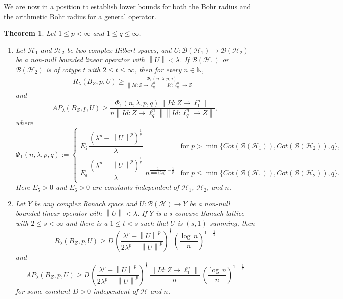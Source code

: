 \documentclass[a4paper,11pt, reqno]{amsart}
\newtheorem{thm}{Theorem}[section]
\theoremstyle{definition}
\newcommand{\norm}[1]{\left\lVert#1\right\rVert}
\begin{document}
We are now in a position to establish lower bounds for both the Bohr radius and the arithmetic Bohr radius for a general operator.
	\begin{thm} \label{thm-1.9}
	Let $1 \leq p < \infty$ and $1\leq q \leq \infty$.
	\begin{enumerate}
		\item Let $\mathcal{H}_1$ and $\mathcal{H}_2$ be two complex Hilbert spaces, and $U: \mathcal{B}(\mathcal{H}_1) \rightarrow \mathcal{B}(\mathcal{H}_2)$ be a non-null bounded linear operator with $\norm{U}<\lambda$. If $\mathcal{B}(\mathcal{H}_1)$ or $\mathcal{B}(\mathcal{H}_2)$ is of cotype $t$ with $2 \leq t \leq \infty$, then for every $n \in \mathbb{N}$,	
	\begin{align*}
	R_{\lambda}(B_{Z}, p,U) \geq \frac{\Phi_{1}(n,\lambda,p,q)}{\norm{Id:Z \rightarrow \ell^n _q} \norm{Id:\ell^n _q \rightarrow Z}}
	\end{align*} 
and
\begin{equation*}
	AP_{\lambda}(B_{Z}, p,U) \geq \frac{\Phi_{1}(n,\lambda,p,q)\, \norm{Id:Z \rightarrow \ell^n _1}}{n\norm{Id:Z \rightarrow \ell^n _q} \norm{Id:\ell^n _q \rightarrow Z}},
\end{equation*}
	where
	\begin{equation*}
		\Phi_{1}(n,\lambda,p,q):=	\begin{cases}
			
			E_{5}\,\dfrac{\left(\lambda^p -\norm{U}^p\right)^{\frac{1}{p}}}{\lambda} & \text{for $p>\min \{Cot(\mathcal{B}(\mathcal{H}_1)),Cot(\mathcal{B}(\mathcal{H}_2)),q\}$}, \\[2mm]
			E_{6}\, \dfrac{\left(\lambda^p -\norm{U}^p\right)^{\frac{1}{p}}}{\lambda}\,\, n^{{\frac{1}{\min\{t,q\}}}-\frac{1}{p}} & \text{for $p\leq \min \{Cot(\mathcal{B}(\mathcal{H}_1)),Cot(\mathcal{B}(\mathcal{H}_2)),q\}$}.
		\end{cases}
	\end{equation*}
	Here $E_{5}>0$ and $E_{6}>0$ are constants independent of $\mathcal{H}_1$, $\mathcal{H}_2$, and $n$.
	\item Let $Y$ be any complex Banach space and $U: \mathcal{B}(\mathcal{H}) \rightarrow Y$ be a non-null bounded linear operator with $\norm{U}<\lambda$. If $Y$ is a $s$-concave Banach lattice with $2 \leq s < \infty$ and there is a $1 \leq t <s$ such that $U$ is $(s,1)$-summing, then
	\begin{equation*}
		R_{\lambda}(B_Z,p,U) \geq D\, \left(\frac{\lambda^p - \norm{U}^p}{2\lambda^p - \norm{U}^p}\right)^{\frac{1}{p}} \, \left(\frac{\log \, n}{n}\right)^{1-\frac{1}{s}} 
	\end{equation*}
and \begin{equation*}
AP_{\lambda}(B_Z,p,U) \geq D\, \left(\frac{\lambda^p - \norm{U}^p}{2\lambda^p - \norm{U}^p}\right)^{\frac{1}{p}} \, \frac{\norm{Id:Z \rightarrow \ell^n _1}}{n}\,\left(\frac{\log \, n}{n}\right)^{1-\frac{1}{s}}
\end{equation*}
for some constant $D>0$ independent of $\mathcal{H}$ and $n$.
\end{enumerate}
	\end{thm}
\end{document}
